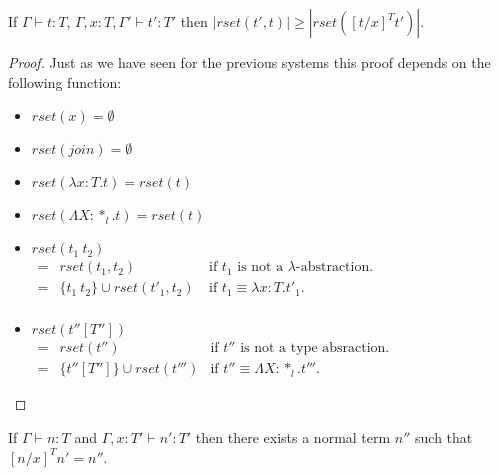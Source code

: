 \begin{lemma}
  \label{lemma:redex_preserving_ssfe}
  If $\Gamma \vdash t : T$, $\Gamma, x:T, \Gamma' \vdash t':T'$
  then  $|rset(t', t)| \geq |rset([t/x]^T t')|$.
\end{lemma}
\begin{proof}
  Just as we have seen for the previous systems this proof depends on
  the following function:
  \begin{center}
    \begin{itemize}
    \item[] $rset(x) = \emptyset$\\
    \item[] $rset(join) = \emptyset$
    \item[] $rset(\lambda x:T.t) = rset(t)$\\
    \item[] $rset(\Lambda X:*_l.t) = rset(t)$\\
    \item[] $rset(t_1\ t_2)$\\
      \begin{math}
        \begin{array}{lll}
          = & rset(t_1, t_2) & \text{if } t_1 \text{ is not a } \lambda \text{-abstraction.}\\
          = & \{t_1\ t_2\} \cup rset(t'_1, t_2)\ & \text{if } t_1 \equiv \lambda x:T.t'_1.\\
        \end{array}
      \end{math}
    \item[] $rset(t''[T''])$\\
      \begin{math}
        \begin{array}{lll}
          = & rset(t'') & \text{if } t'' \text{ is not a type absraction.}\\
          = & \{t''[T'']\} \cup rset(t''') & \text{if } t'' \equiv \Lambda X:*_l.t'''.
        \end{array}
      \end{math}
    \end{itemize}
  \end{center}  
\end{proof}

\begin{lemma}
  \label{corollary:normalization_preserving_ssfe}
  If $\Gamma \vdash n:T$ and $\Gamma, x:T' \vdash n':T'$ then there exists a normal term $n''$ 
  such that $[n/x]^T n' = n''$.
\end{lemma}

